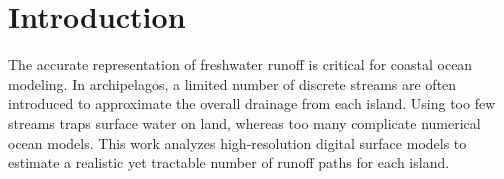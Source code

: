 \section{Introduction}
The accurate representation of freshwater runoff is critical for coastal ocean modeling. In archipelagos, a limited number of discrete streams are often introduced to approximate the overall drainage from each island. Using too few streams traps surface water on land, whereas too many complicate numerical ocean models. This work analyzes high-resolution digital surface models to estimate a realistic yet tractable number of runoff paths for each island.
